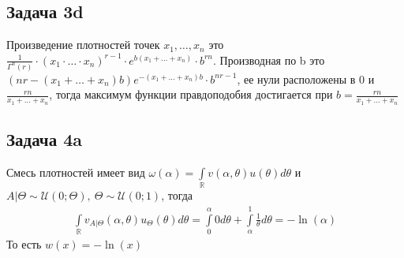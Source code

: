 \subsection*{Задача 3d}
Произведение плотностей точек $x_1, \ldots, x_n$ это $\frac{1}{\Gamma^n(r)} \cdot (x_1 \cdot \ldots \cdot x_n)^{r-1} \cdot e^{b(x_1 + \ldots + x_n)} \cdot b^{rn}$. Производная по b это $(nr - (x_1 + \ldots + x_n)b)e^{-(x_1 + \ldots + x_n)b} \cdot b^{nr-1}$, ее нули расположены в $0$ и $\frac{rn}{x_1 + \ldots + x_n}$, тогда максимум функции правдоподобия достигается при $b = \frac{rn}{x_1 + \ldots + x_n}$
\vskip 0.4in



\subsection*{Задача 4a}
Смесь плотностей имеет вид $\omega(\alpha) = \int\limits_{\mathbb{R}} v(\alpha, \theta) u(\theta) d \theta$ и $A| \Theta \sim \mathcal{U}(0; \Theta),\ \Theta \sim \mathcal{U}(0; 1)$, тогда
\begin{gather*}
    \int\limits_{\mathbb{R}} v_{A|\Theta}(\alpha, \theta) u_{\Theta}(\theta) d \theta
    = \int\limits_{0}^{\alpha} 0 d \theta + \int\limits_{\alpha}^{1} \frac{1}{\theta} d \theta
    = -\ln(\alpha)
\end{gather*}
То есть $w(x) = -\ln(x)$

